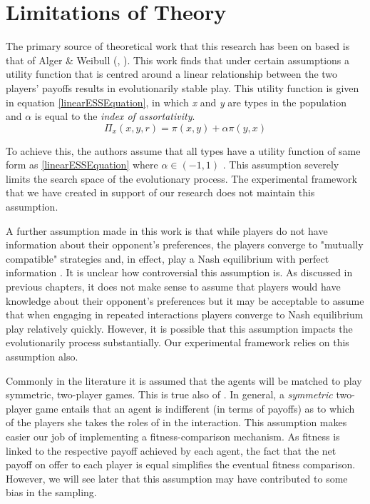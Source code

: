 \documentclass[11pt]{book}
\newcommand*{\np}{\par\noindent\newline}
\begin{document}
\section{Limitations of Theory}
\np The primary source of theoretical work that this research has been on based is that of Alger \& Weibull (\citet{alger_generalization_2012}, \citet{alger_homo_2013}).
This work finds that under certain assumptions a utility function that is centred around a linear relationship between the two players' payoffs results in evolutionarily stable play.
This utility function is given in equation \ref{linearESSEquation}, in which \textit{x} and \textit{y} are types in the population and $\alpha$ is equal to the \textit{index of assortativity}.
\begin{equation}
	\label{linearESSEquation}
	\Pi_x(x, y, r) = \pi(x,y) + \alpha\pi(y,x)
\end{equation}

\noindent To achieve this, the authors assume that all types have a utility function of same form as \ref{linearESSEquation} where $\alpha \in (-1, 1)$ \citep[p. ~47]{alger_generalization_2012}.
This assumption severely limits the search space of the evolutionary process. The experimental framework that we have created in support of our research does not maintain this assumption.

\np A further assumption made in this work is that while players do not have information about their opponent's preferences,
the players converge to "mutually compatible" strategies and, in effect, play a Nash equilibrium with perfect information \citep[p. ~46]{alger_generalization_2012}.
It is unclear how controversial this assumption is. 
As discussed in previous chapters, it does not make sense to assume that players would have knowledge about their opponent's preferences 
but it may be acceptable to assume that when engaging in repeated interactions players converge to Nash equilibrium play relatively quickly.
However, it is possible that this assumption impacts the evolutionarily process substantially. Our experimental framework relies on this assumption also.

\np Commonly in the literature it is assumed that the agents will be matched to play symmetric, two-player games.
This is true also of \citet{alger_generalization_2012}.
In general, a \textit{symmetric} two-player game entails that an agent is indifferent (in terms of payoffs) as to which of the players she takes the roles of in the interaction.
This assumption makes easier our job of implementing a fitness-comparison mechanism.
As fitness is linked to the respective payoff achieved by each agent, the fact that the net payoff on offer to each player is equal simplifies the eventual fitness comparison.
However, we will see later that this assumption may have contributed to some bias in the sampling.
\end{document}
